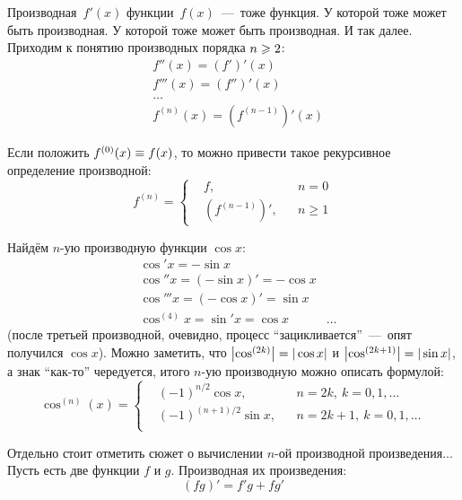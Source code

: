 \documentclass[a4paper,12pt]{article}
\begin{document}
  Производная~$f'(x)$ функции~$f(x)$~---~тоже функция.
  У которой тоже может быть производная.
  У которой тоже может быть производная.
  И так далее.
  Приходим к понятию производных порядка $n \hm\geq 2$:
  \[
    \begin{aligned}
      &f''(x) = (f')'(x)\\
      &f'''(x) = (f'')'(x)\\
      &\ldots\\
      &f^{(n)}(x) = \left(f^{(n - 1)}\right)'(x)
    \end{aligned}
  \]

  Если положить $f^{(0)}(x) \hm\equiv f(x)$, то можно привести такое рекурсивное определение производной:
  \[
    f^{(n)} = \left\{
      \begin{aligned}
        &f,              & &n = 0\\
        &\left(f^{(n - 1)}\right)', & &n \geq 1 
      \end{aligned}
    \right.
  \]

  \begin{example}\label{eq:cos-x}
    Найдём $n$-ую производную функции $\cos x$:
    \[
      \begin{aligned}
        &\cos' x = {-}\sin x\\
        &\cos'' x = ({-}\sin x)' = {-}\cos x\\
        &\cos''' x = ({-}\cos x)' = \sin x\\
        &\cos^{(4)} x = \sin' x = \cos x
        &\ldots
      \end{aligned}
    \]
    (после третьей производной, очевидно, процесс ``зацикливается''~---~опят получился $\cos x$).
    Можно заметить, что $\left|\cos^{(2k)}\right| \hm= |\cos x|$ и $\left|\cos^{(2k + 1)}\right| \hm= |\sin x|$, а знак ``как-то'' чередуется, итого $n$-ую производную можно описать формулой:
    \[
      \cos^{(n)}(x) = \left\{
        \begin{aligned}
          &(-1)^{n/2} \cos x, & &n = 2k,\ k = 0, 1, \ldots\\
          &(-1)^{(n + 1)/2} \sin x, & &n = 2k + 1,\ k = 0, 1, \ldots\\
        \end{aligned}
      \right.
    \]
  \end{example}

  Отдельно стоит отметить сюжет о вычислении $n$-ой производной произведения...
  Пусть есть две функции $f$ и $g$.
  Производная их произведения:
  \[
    (fg)' = f' g + f g'
  \]
\end{document}
